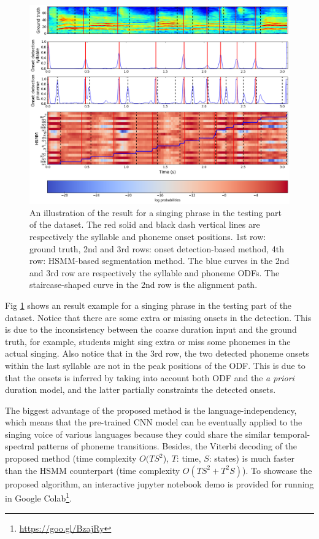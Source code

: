 \begin{figure}[ht!]
    \centering
    \includegraphics[width=\textwidth]{figs/results/ch5_results_segmentation.png}
    \caption{An illustration of the result for a singing phrase in the testing part of the dataset. The red solid and black dash vertical lines are respectively the syllable and phoneme onset positions. 1st row: ground truth, 2nd and 3rd rows: onset detection-based method, 4th row: \gls{HSMM}-based segmentation method. The blue curves in the 2nd and 3rd row are respectively the syllable and phoneme ODFs. The staircase-shaped curve in the 2nd row is the alignment path.}
    \label{fig:ch5:results_example_onset}
\end{figure}


Fig \ref{fig:ch5:results_example_onset} shows an result example for a singing phrase in the testing part of the dataset. Notice that there are some extra or missing onsets in the detection. This is due to the inconsistency between the coarse duration input and the ground truth, for example, students might sing extra or miss some phonemes in the actual singing. Also notice that in the 3rd row, the two detected phoneme onsets within the last syllable are not in the peak positions of the \gls{ODF}. This is due to that the onsets is inferred by taking into account both \gls{ODF} and the \textit{a priori} duration model, and the latter partially constraints the detected onsets.

The biggest advantage of the proposed method is the language-independency, which means that the pre-trained \gls{CNN} model can be eventually applied to the singing voice of various languages because they could share the similar temporal-spectral patterns of phoneme transitions. Besides, the Viterbi decoding of the proposed method (time complexity $O(TS^2$), $T$: time, $S$: states) is much faster than the \gls{HSMM} counterpart (time complexity $O(TS^2+T^2S)$). To showcase the proposed algorithm, an interactive jupyter notebook demo is provided for running in Google Colab\footnote{\url{https://goo.gl/BzajRy}}. 

